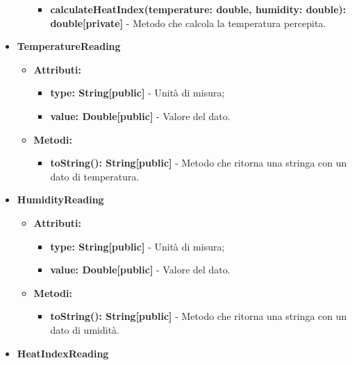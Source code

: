 \documentclass[8pt]{article}
\begin{document}
\begin{itemize}
\begin{itemize}
\begin{itemize}
            \item \textbf{calculateHeatIndex(temperature: double, humidity: double): double[private]} - Metodo che calcola la temperatura percepita.
        \end{itemize}
    \end{itemize}
    \item \textbf{TemperatureReading}
    \begin{itemize}
        \item \textbf{Attributi:}
        \begin{itemize}
            \item \textbf{type: String[public]} - Unità di misura;
            \item \textbf{value: Double[public]} - Valore del dato.
        \end{itemize}
    \end{itemize}
    \begin{itemize}
        \item \textbf{Metodi:}
        \begin{itemize}
            \item \textbf{toString(): String[public]} - Metodo che ritorna una stringa con un dato di temperatura.
        \end{itemize}
    \end{itemize}
    \item \textbf{HumidityReading}
    \begin{itemize}
        \item \textbf{Attributi:}
        \begin{itemize}
            \item \textbf{type: String[public]} - Unità di misura;
            \item \textbf{value: Double[public]} - Valore del dato.
        \end{itemize}
    \end{itemize}
    \begin{itemize}
        \item \textbf{Metodi:}
        \begin{itemize}
            \item \textbf{toString(): String[public]} - Metodo che ritorna una stringa con un dato di umidità.
        \end{itemize}
    \end{itemize}
    \item \textbf{HeatIndexReading}
    \begin{itemize}

\end{itemize}
\end{itemize}
\end{document}
